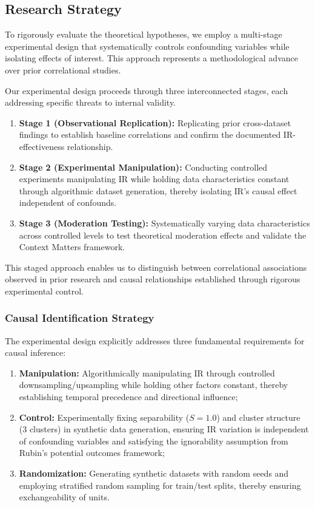 \documentclass[12pt,a4paper]{article}
\theoremstyle{definition}
\begin{document}
\subsection{Research Strategy}
To rigorously evaluate the theoretical hypotheses, we employ a multi-stage experimental design that systematically controls confounding variables while isolating effects of interest. This approach represents a methodological advance over prior correlational studies.

Our experimental design proceeds through three interconnected stages, each addressing specific threats to internal validity.

\begin{enumerate}
 \item \textbf{Stage 1 (Observational Replication):} Replicating prior cross-dataset findings to establish baseline correlations and confirm the documented IR-effectiveness relationship.
 
 \item \textbf{Stage 2 (Experimental Manipulation):} Conducting controlled experiments manipulating IR while holding data characteristics constant through algorithmic dataset generation, thereby isolating IR's causal effect independent of confounds.
 
 \item \textbf{Stage 3 (Moderation Testing):} Systematically varying data characteristics across controlled levels to test theoretical moderation effects and validate the Context Matters framework.
\end{enumerate}

This staged approach enables us to distinguish between correlational associations observed in prior research and causal relationships established through rigorous experimental control.

\subsubsection{Causal Identification Strategy}
The experimental design explicitly addresses three fundamental requirements for causal inference:

\begin{enumerate}
 \item \textbf{Manipulation:} Algorithmically manipulating IR through controlled downsampling/upsampling while holding other factors constant, thereby establishing temporal precedence and directional influence;
 
 \item \textbf{Control:} Experimentally fixing separability ($S=1.0$) and cluster structure (3 clusters) in synthetic data generation, ensuring IR variation is independent of confounding variables and satisfying the ignorability assumption from Rubin's potential outcomes framework;
 
 \item \textbf{Randomization:} Generating synthetic datasets with random seeds and employing stratified random sampling for train/test splits, thereby ensuring exchangeability of units.
\end{enumerate}
\end{document}
